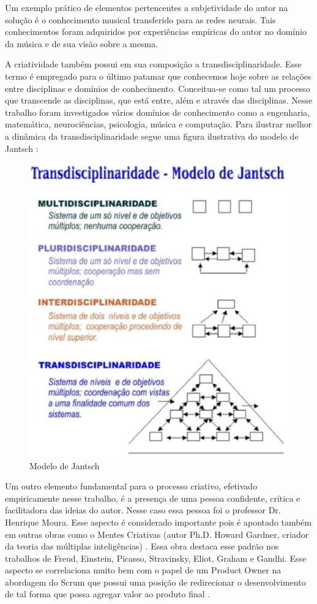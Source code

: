 Um exemplo prático de elementos pertencentes a subjetividade do autor na solução é o conhecimento musical transferido para as redes neurais. Tais conhecimentos foram adquiridos por experiências empíricas do autor no domínio da música e de sua visão sobre a mesma.

A criatividade também possui em sua composição a transdisciplinaridade. Esse termo é empregado para o último patamar que conhecemos hoje sobre as relações entre disciplinas e domínios de conhecimento. Conceitua-se como tal um processo que transcende as disciplinas, que está entre, além e através das disciplinas. Nesse trabalho foram investigados vários domínios de conhecimento como a engenharia, matemática, neurociências, psicologia, música e computação. Para ilustrar melhor a dinâmica da transdisciplinaridade segue uma figura ilustrativa do modelo de Jantsch \cite{jantsh}:

\begin{figure}[h]
  \centering
    \includegraphics[keepaspectratio=true,scale=0.7]{figuras/trans.eps}
  \caption{Modelo de Jantsch}
\end{figure}

Um outro elemento fundamental para o processo criativo, efetivado empiricamente nesse trabalho, é a presença de uma pessoa confidente, crítica e facilitadora das ideias do autor. Nesse caso essa pessoa foi o professor Dr. Henrique Moura. Esse aspecto é considerado importante pois é apontado também em outras obras como o Mentes Criativas (autor Ph.D. Howard Gardner, criador da teoria das múltiplas inteligências) \cite{gardner}. Essa obra destaca esse padrão nos trabalhos de Freud, Einstein, Picasso, Stravinsky, Eliot, Graham e Gandhi. Esse aspecto se correlaciona muito bem com o papel de um Product Owner na abordagem do Scrum que possui uma posição de redirecionar o desenvolvimento de tal forma que possa agregar valor ao produto final \cite{PO}.

